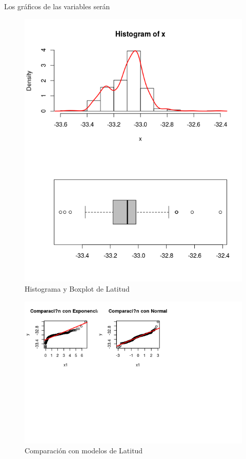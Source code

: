 \documentclass{article}
\begin{document}
\begin{enumerate}[a)]
Los gráficos de las variables serán
\begin{figure}[h!]
\centering
\includegraphics[scale=0.5]{./figures/histplot_Latitud.png}
\caption{Histograma y Boxplot de Latitud}
\end{figure}

\begin{figure}[h!]
\centering
\includegraphics[scale=0.5]{./figures/cm_Latitud.png}
\caption{Comparación con modelos de Latitud}
\end{figure}


\end{enumerate}
\end{document}
